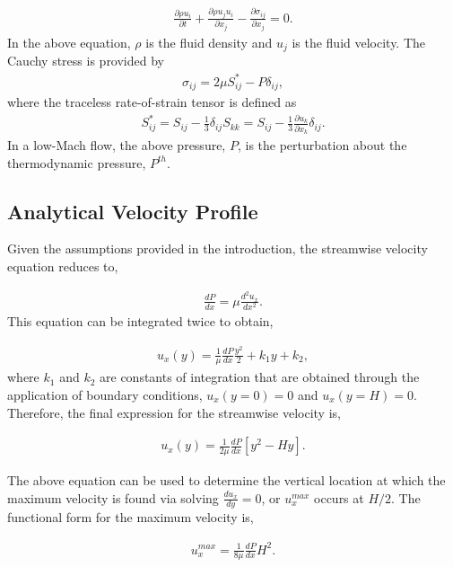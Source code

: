 \documentclass{article}
\begin{document}
\begin{align}
  \frac {\partial \rho u_i }{\partial t} + \frac{ \partial \rho u_j u_i}{\partial x_j} 
-\frac{\partial \sigma_{ij}}{\partial x_j} = 0.
\label{eq:momEq}
\end{align}
%
In the above equation, $\rho$ is the fluid density and $u_j$ is the fluid velocity. 
The Cauchy stress is provided by
\begin{align}
\sigma_{ij}  = 2 \mu S^*_{ij} - P \delta_{ij},
\end{align}
%
where the traceless rate-of-strain tensor is defined as
\begin{align}
S^*_{ij}  = S_{ij} - \frac{1}{3} \delta_{ij} S_{kk} \nonumber
		     = S_{ij} - \frac{1}{3} \frac{\partial  u_k }{\partial x_k}\delta_{ij}.
\end{align}
In a low-Mach flow, the above pressure, $P$, is the perturbation about the thermodynamic
pressure, $P^{th}$. 

\subsection{Analytical Velocity Profile}
Given the assumptions provided in the introduction, the streamwise velocity equation reduces to,

\begin{align}
  \frac{d P}{dx} = \mu \frac{d^2 u_x}{dx^2}.
\label{eq:simpEq}
\end{align}
This equation can be integrated twice to obtain,

\begin{align}
  u_x(y) = \frac{1}{\mu}\frac{d P}{dx} \frac{y^2}{2} + k_1 y + k_2,
\label{eq:simpEqWithK}
\end{align}
where $k_1$ and $k_2$ are constants of integration that are obtained through the 
application of boundary conditions, $u_x(y=0) = 0$ and  $u_x(y=H) = 0$. Therefore,
the final expression for the streamwise velocity is,

\begin{align}
  u_x(y) = \frac{1}{2 \mu}\frac{d P}{dx}\left[ y^2 - Hy \right].
\label{eq:simpleEqWithoutK}
\end{align}

The above equation can be used to determine the vertical location at which 
the maximum velocity is found via solving $\frac{du_x}{dy} = 0$, or $u^{max}_x$ 
occurs at $H/2$. The functional form for the maximum velocity is,

\begin{align}
  u^{max}_x = \frac{1}{8 \mu}\frac{d P}{dx}H^2.
\label{eq:uMax}
\end{align}
\end{document}
